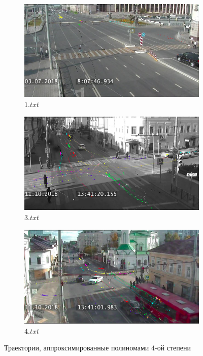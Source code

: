 \begin{figure}
	\centering
	\begin{subfigure}[b]{0.3\textwidth}
		\centering{}
		\includegraphics[width=\textwidth]{images/regr_1_pol_4.jpg}
		\caption{$1.txt$}
		\label{fig:regr-1-pol-4}
	\end{subfigure}
	\hfill
	\begin{subfigure}[b]{0.3\textwidth}
		\centering{}
		\includegraphics[width=\textwidth]{images/regr_3_pol_4.png}
		\caption{$3.txt$}
		\label{fig:regr-3-pol-4}
	\end{subfigure}
	\hfill
	\begin{subfigure}[b]{0.3\textwidth}
		\centering{}
		\includegraphics[width=\textwidth]{images/regr_4_pol_4.png}
		\caption{$4.txt$}
		\label{fig:regr-4-pol-4}
	\end{subfigure}
	\caption{Траектории, аппроксимированные полиномами $4$-ой степени}
	\label{fig:regr-pol-4}
\end{figure}

